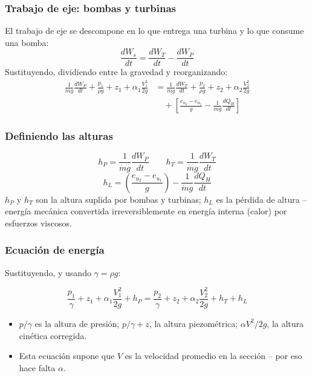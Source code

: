 \documentclass{ltx-talk}
\begin{document}
\begin{frame}
  \frametitle{Trabajo de eje: bombas y turbinas}
  El trabajo de eje se descompone en lo que entrega una turbina y lo
  que consume una bomba:
  \[
    \frac{dW_s}{dt} = \frac{dW_T}{dt} - \frac{dW_P}{dt}
  \]
  Sustituyendo, dividiendo entre la gravedad y reorganizando:
  \begin{align*}
    \frac{1}{\dot m g}\frac{dW_P}{dt} + \frac{p_1}{\rho g}+z_1+\alpha_1\frac{V_1^2}{2g}
      &= \frac{1}{\dot m g}\frac{dW_T}{dt} + \frac{p_2}{\rho g}+z_2+\alpha_2\frac{V_2^2}{2g} \\
      &\quad + \left[\frac{e_{u_2}-e_{u_1}}{g} - \frac{1}{\dot m g}\frac{dQ_H}{dt}\right]
  \end{align*}
\end{frame}

\begin{frame}
  \frametitle{Definiendo las alturas}
  \[
    h_P = \frac{1}{\dot m g}\frac{dW_P}{dt}
    \qquad
    h_T = \frac{1}{\dot m g}\frac{dW_T}{dt}
  \]
  \[
    h_L = \left(\frac{e_{u_2}-e_{u_1}}{g}\right) - \frac{1}{\dot m g}\frac{dQ_H}{dt}
  \]
  $h_P$ y $h_T$ son la altura suplida por bombas y turbinas; $h_L$ es
  la pérdida de altura -- energía mecánica convertida irreversiblemente
  en energía interna (calor) por esfuerzos viscosos.
\end{frame}

\begin{frame}
  \frametitle{Ecuación de energía}
  Sustituyendo, y usando $\gamma = \rho g$:
  \begin{icvwarning}
  \[
    \frac{p_1}{\gamma}+z_1+\alpha_1\frac{V_1^2}{2g}+h_P
      = \frac{p_2}{\gamma}+z_2+\alpha_2\frac{V_2^2}{2g}+h_T+h_L
  \]
  \end{icvwarning}
  \vspace{0.5em}
  \begin{itemize}
    \item $p/\gamma$ es la altura de presión; $p/\gamma + z$, la altura
      piezométrica; $\alpha V^2/2g$, la altura cinética corregida.
    \item Esta ecuación supone que $V$ es la velocidad promedio en la
      sección -- por eso hace falta $\alpha$.
  \end{itemize}
\end{frame}
\end{document}
